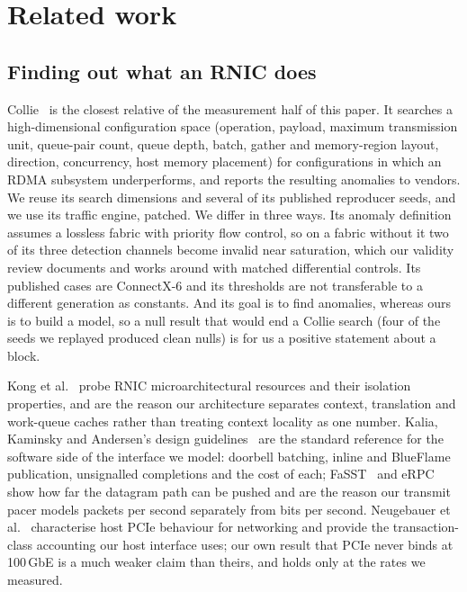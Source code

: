 \section{Related work}
\label{sec:related}

\subsection{Finding out what an RNIC does}

Collie~\cite{collie2022} is the closest relative of the measurement half of this
paper. It searches a high-dimensional configuration space (operation, payload,
maximum transmission unit, queue-pair count, queue depth, batch, gather and
memory-region layout, direction, concurrency, host memory placement) for
configurations in which an RDMA subsystem underperforms, and reports the
resulting anomalies to vendors. We reuse its search dimensions and several of
its published reproducer seeds, and we use its traffic engine, patched. We
differ in three ways. Its anomaly definition assumes a lossless fabric with
priority flow control, so on a fabric without it two of its three detection
channels become invalid near saturation, which our validity review documents
and works around with matched differential controls. Its published cases are
ConnectX-6 and its thresholds are not transferable to a different generation as
constants. And its goal is to find anomalies, whereas ours is to build a model,
so a null result that would end a Collie search (four of the seeds we replayed
produced clean nulls) is for us a positive statement about a block.

Kong et al.~\cite{rnic-micro2023} probe RNIC microarchitectural resources and
their isolation properties, and are the reason our architecture separates
context, translation and work-queue caches rather than treating context
locality as one number. Kalia, Kaminsky and Andersen's design
guidelines~\cite{kalia2016} are the standard reference for the software side of
the interface we model: doorbell batching, inline and BlueFlame publication,
unsignalled completions and the cost of each; FaSST~\cite{fasst2016} and
eRPC~\cite{erpc2019} show how far the datagram path can be pushed and are the
reason our transmit pacer models packets per second separately from bits per
second. Neugebauer et al.~\cite{pcie2018} characterise host PCIe behaviour for
networking and provide the transaction-class accounting our host interface
uses; our own result that PCIe never binds at 100\,GbE is a much weaker claim
than theirs, and holds only at the rates we measured.

